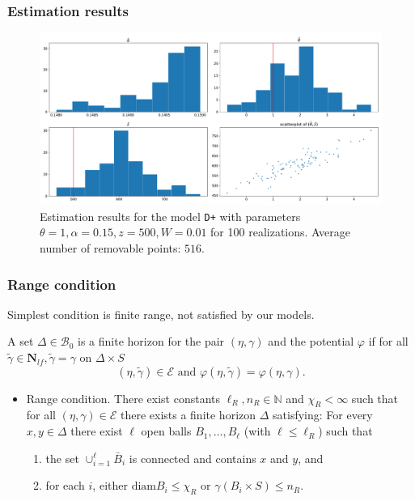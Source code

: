 \documentclass[c, 10pt]{beamer}
\begin{document}
\begin{frame}[noframenumbering]\frametitle{Estimation results}
	
\begin{figure}
  \centering
  \includegraphics[width=1\textwidth]{./FigureLayout/estimation-type_D+_theta_1}
  \caption{Estimation results for the model \texttt{D+} with parameters $\theta=1,\alpha=0.15,z=500,W=0.01$ for 100 realizations. Average number of removable points: $516$.}
\end{figure}

\end{frame}


\begin{frame}[noframenumbering]\frametitle{Range condition}

	Simplest condition is \alert{finite range}, not satisfied by our models. \newline


	A set $\Delta \in \mathcal B_0$ is a \alert{finite horizon} for the pair $(\eta,\gamma)$ and the potential $\varphi$ if for all $\tilde{\gamma} \in \mathbf N_{lf}, \tilde{\gamma} = \gamma$ on $\Delta\times S$ 
$$(\eta,\tilde{\gamma})\in\mathcal E \text{ and } \varphi(\eta,\tilde{\gamma}) = \varphi(\eta,\gamma). $$

\begin{itemize}
	\item \alert{Range condition}. There exist constants $\ell_R,n_R \in \mathbb N$ and $\chi_R < \infty$ such that for all $(\eta,\gamma) \in \mathcal E$ there exists a finite horizon $\Delta$ satisfying: For every $x,y \in \Delta$ there exist $\ell$ open balls $B_1, \dots, B_\ell$ (with $\ell \leq \ell_R$) such that
	\begin{enumerate}[-]
		\item the set $\cup^\ell_{i=1} \bar B_i$ is connected and contains $x$ and $y$, and 
		\item for each $i$, either $\text{diam} B_i \leq \chi_R$ or $\gamma(B_i\times S) \leq n_R$.
	\end{enumerate}
\end{itemize}
\end{frame}
\end{document}
